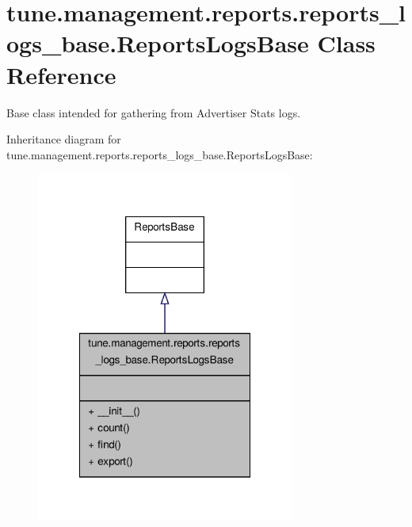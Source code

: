 \hypertarget{classtune_1_1management_1_1reports_1_1reports__logs__base_1_1ReportsLogsBase}{\section{tune.\-management.\-reports.\-reports\-\_\-logs\-\_\-base.\-Reports\-Logs\-Base Class Reference}
\label{classtune_1_1management_1_1reports_1_1reports__logs__base_1_1ReportsLogsBase}
}


Base class intended for gathering from Advertiser Stats logs.  




Inheritance diagram for tune.\-management.\-reports.\-reports\-\_\-logs\-\_\-base.\-Reports\-Logs\-Base\-:
\nopagebreak
\begin{figure}[H]
\begin{center}
\leavevmode
\includegraphics[width=240pt]{classtune_1_1management_1_1reports_1_1reports__logs__base_1_1ReportsLogsBase__inherit__graph}
\end{center}
\end{figure}


